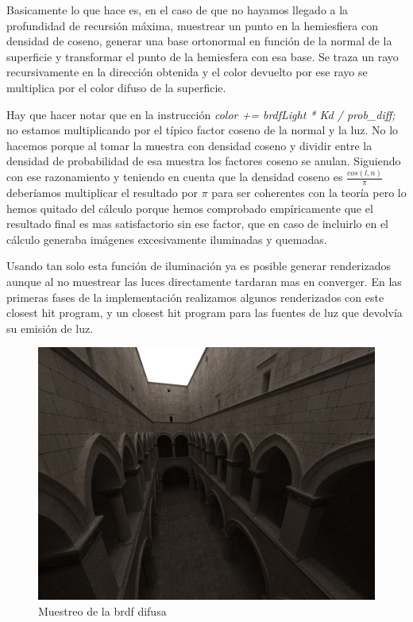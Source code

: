 Basicamente lo que hace es, en el caso de que no hayamos llegado a la profundidad de recursión máxima, muestrear un punto en la hemiesfiera con densidad de coseno, generar una base ortonormal en función de la normal de la superficie y transformar el punto de la hemiesfera con esa base. Se traza un rayo recursivamente en la dirección obtenida y el color devuelto por ese rayo se multiplica por el color difuso de la superficie.

\medskip

Hay que hacer notar que en la instrucción \emph{color += brdfLight * Kd / prob\_diff;} no estamos multiplicando por el típico factor coseno de la normal y la luz. No lo hacemos porque al tomar la muestra con densidad coseno y dividir entre la densidad de probabilidad de esa muestra los factores coseno se anulan.
Siguiendo con ese razonamiento y teniendo en cuenta que la densidad coseno es $\frac{cos(l,n)}{\pi}$ deberíamos multiplicar el resultado por $\pi$ para ser coherentes con la teoría pero lo hemos quitado del cálculo porque hemos comprobado empíricamente que el resultado final es mas satisfactorio sin ese factor, que en caso de incluirlo en el cálculo generaba imágenes excesivamente iluminadas y quemadas.

\medskip

Usando tan solo esta función de iluminación ya es posible generar renderizados aunque al no muestrear las luces directamente tardaran mas en converger.
En las primeras fases de la implementación realizamos algunos renderizados con este closest hit program, y un closest hit program para las fuentes de luz que devolvía su emisión de luz.


\begin{figure}[h]
\centering
\includegraphics[width=5in]{dome1.png}
\caption{Muestreo de la brdf difusa}
\end{figure}

